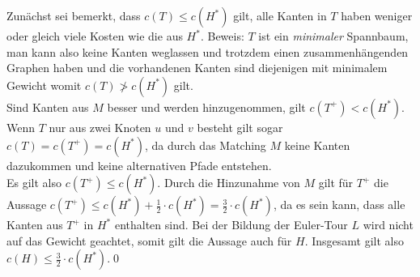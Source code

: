 \documentclass[a4paper]{article}
\begin{document}
	\maketitle
	\section{}
		Zunächst sei bemerkt, dass $c(T)\leq c(H^*)$ gilt, alle Kanten in $T$ haben weniger oder gleich viele Kosten wie die aus $H^*$.\n
		Beweis: $T$ ist ein \textit{minimaler} Spannbaum, man kann also keine Kanten weglassen und trotzdem einen zusammenhängenden Graphen haben und die vorhandenen Kanten sind diejenigen mit minimalem Gewicht womit $c(T)\not> c(H^*)$ gilt.\\
		Sind Kanten aus $M$ besser und werden hinzugenommen, gilt $c(T^+)<c(H^*)$.
		Wenn $T$ nur aus zwei Knoten $u$ und $v$ besteht gilt sogar $c(T)=c(T^+)=c(H^*)$, da durch das Matching $M$ keine Kanten dazukommen und keine alternativen Pfade entstehen.\\
		Es gilt also $c(T^+)\leq c(H^*)$.\n
		Durch die Hinzunahme von $M$ gilt für $T^+$ die Aussage $c(T^+)\leq c(H^*)+\frac{1}{2}\cdot c(H^*)=\frac{3}{2}\cdot c(H^*)$, da es sein kann, dass alle Kanten aus $T^+$ in $H^*$ enthalten sind.
		Bei der Bildung der Euler-Tour $L$ wird nicht auf das Gewicht geachtet, somit gilt die Aussage auch für $H$.\n
		Insgesamt gilt also $c(H)\leq \frac{3}{2}\cdot c(H^*)$.\qed
	\section{}
\end{document}
